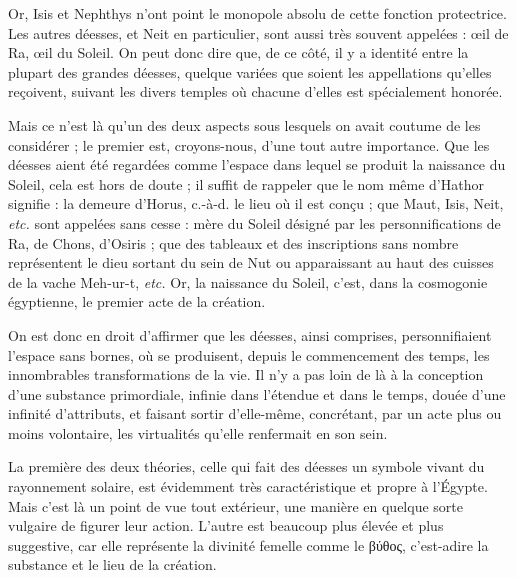 \documentclass[a4paper, 11pt, oneside]{article}
\newcommand*\hieroAARM{}
\begin{document}
Or, Isis et Nephthys n'ont point le monopole absolu de cette fonction protectrice. Les autres déesses, et Neit en particulier, sont aussi très souvent appelées : œil de Ra, œil du Soleil. On peut donc dire que, de ce côté, il y a identité entre la plupart des grandes déesses, quelque variées que soient les appellations qu'elles reçoivent, suivant les divers temples où chacune d'elles est spécialement honorée.

Mais ce n'est là qu'un des deux aspects sous lesquels on avait coutume de les considérer ; le premier est, croyons-nous, d'une tout autre importance. Que les déesses aient été regardées comme l'espace dans lequel se produit la naissance du Soleil, cela est hors de doute ; il suffit de rappeler que le nom même d'Hathor $\hieroAARM$ signifie : la demeure d'Horus, c.-à-d. le lieu où il est conçu ; que Maut, Isis, Neit, \emph{etc.} sont appelées sans cesse : mère du Soleil désigné par les personnifications de Ra, de Chons, d'Osiris ; que des tableaux et des inscriptions sans nombre représentent le dieu sortant du sein de Nut ou apparaissant au haut des cuisses de la vache Meh-ur-t, \emph{etc.} Or, la naissance du Soleil, c'est, dans la cosmogonie égyptienne, le premier acte de la création.

On est donc en droit d'affirmer que les déesses, ainsi comprises, personnifiaient l'espace sans bornes, où se produisent, depuis le commencement des temps, les innombrables transformations de la vie. Il n'y a pas loin de là à la conception d'une substance primordiale, infinie dans l'étendue et dans le temps, douée d'une infinité d'attributs, et faisant sortir d'elle-même, concrétant, par un acte plus ou moins volontaire, les virtualités qu'elle renfermait en son sein.

La première des deux théories, celle qui fait des déesses un symbole vivant du rayonnement solaire, est évidemment très caractéristique et propre à l'Égypte. Mais c'est là un point de vue tout extérieur, une manière en quelque sorte vulgaire de figurer leur action. L'autre est beaucoup plus élevée et plus suggestive, car elle représente la divinité femelle comme le βύθος, c'est-adire la substance et le lieu de la création.
\end{document}
